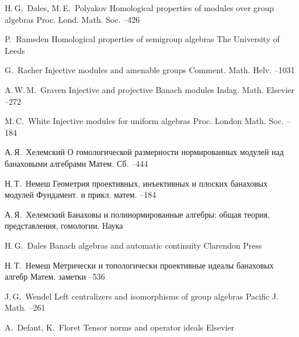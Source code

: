 \documentclass{article}
\numberwithin{equation}{section}
\theoremstyle{plain}
\theoremstyle{definition}
\begin{document}
\begin{thebibliography}{99}

%
\by H.\,G.~Dales, M.\,E.~Polyakov 
\paper Homological properties of modules over group algebras
\jour Proc. Lond.  Math. Soc. 
--426

%
\by P.~Ramsden 
\thesis Homological properties of semigroup algebras
\publaddr The University of Leeds 

\by G.~Racher 
\paper Injective modules and amenable groups
\jour Comment. Math. Helv. 
--1031

\by A.\,W.\,M.~Graven 
\paper Injective and projective Banach modules
\jour Indag. Math.
\publ Elsevier 
--272

\by M.\,C.~White
\paper Injective modules for uniform algebras
\jour Proc. London Math. Soc. 
--184

\by А.\,Я.~Хелемский 
\paper О гомологической размерности нормированных модулей над банаховыми алгебрами
\jour Матем. Сб. 
--444

\by Н.\,Т.~Немеш 
\paper Геометрия проективных, инъективных и плоских банаховых модулей
\jour Фундамент. и прикл. матем.
--184

\by А.\,Я.~Хелемский 
\book Банаховы и полинормированные алгебры: общая теория, представления, гомологии. 
\publ Наука

\by H.\,G.~Dales 
\book Banach algebras and automatic continuity
\publ Clarendon Press

\by Н.\,Т.~Немеш 
\paper Метрически и топологически проективные идеалы банаховых алгебр
\jour Матем. заметки
--536

\by J.\,G.~Wendel 
\paper Left centralizers and isomorphisms of group algebras
\jour Pacific J. Math. 
--261

\by A.~Defant, K.~Floret
\book Tensor norms and operator ideals 
\publ Elsevier


\end{thebibliography}
\end{document}
